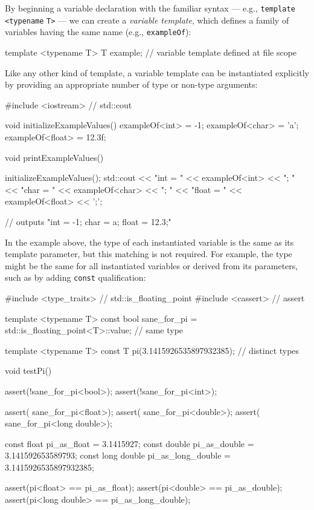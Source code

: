 By beginning a variable declaration with the familiar  syntax --- e.g., \lstinline!template! \lstinline!<typename! \lstinline!T>! --- we can create a \emph{variable template}, which defines a family of variables
having the same name (e.g., \lstinline!exampleOf!):

\begin{emcppslisting}[language=C++]
template <typename T> T example;  // variable template defined at file scope
\end{emcppslisting}

\noindent Like any other kind of template, a variable template can be instantiated explicitly by
providing an appropriate number of type or non-type arguments:

\begin{emcppslisting}[language=C++]
#include <iostream>  // std::cout

void initializeExampleValues()
{
    exampleOf<int>   = -1;
    exampleOf<char>  = 'a';
    exampleOf<float> = 12.3f;
}

void printExampleValues()
{
    initializeExampleValues();
    std::cout << "int = "   << exampleOf<int>   << "; "
              << "char = "  << exampleOf<char>  << "; "
              << "float = " << exampleOf<float> << ';';

    // outputs "int = -1; char = a; float = 12.3;"
}
\end{emcppslisting}

\noindent In the example above, the type of each instantiated variable is the same as its template parameter, but this matching is not required. For example, the type might be the same for all instantiated variables or derived from its parameters, such as by adding \lstinline!const! qualification:

\begin{emcppslisting}[language=C++]
#include <type_traits>  // std::is_floating_point
#include <cassert>      // assert

template <typename T> 
const bool sane_for_pi = std::is_floating_point<T>::value;  // same type

template <typename T> const T pi(3.1415926535897932385);    // distinct types

void testPi()
{
    assert(!sane_for_pi<bool>);
    assert(!sane_for_pi<int>);

    assert( sane_for_pi<float>);
    assert( sane_for_pi<double>);
    assert( sane_for_pi<long double>);

    const float       pi_as_float       = 3.1415927; 
    const double      pi_as_double      = 3.141592653589793; 
    const long double pi_as_long_double = 3.1415926535897932385; 

    assert(pi<float>       == pi_as_float);
    assert(pi<double>      == pi_as_double); 
    assert(pi<long double> == pi_as_long_double); 
}
\end{emcppslisting}

